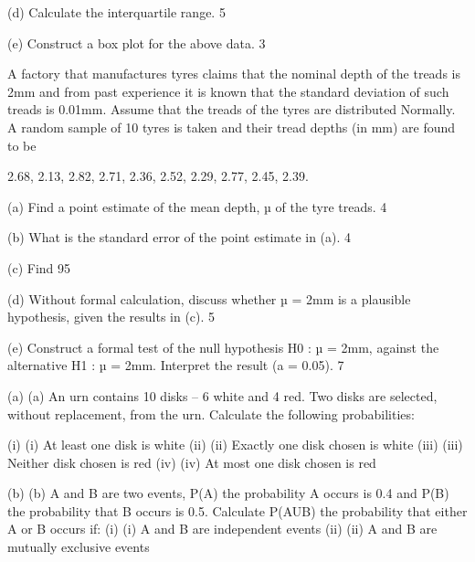 (d) Calculate the interquartile range. 						5
 
(e) Construct a box plot for the above data. 					3


A factory that manufactures tyres claims that the nominal depth of the treads is 2mm and from past experience it is known that the standard deviation of such treads is 0.01mm. Assume that the treads of the tyres are distributed Normally. A random sample of 10 tyres is taken and their tread depths (in mm) are found to be 
 
2.68, 2.13, 2.82, 2.71, 2.36, 2.52, 2.29, 2.77, 2.45, 2.39.
 
(a) Find a point estimate of the mean depth, µ of the tyre treads. 		4 
 
(b) What is the standard error of the point estimate in (a). 			4
 
(c) Find 95%
 
(d) Without formal calculation, discuss whether µ = 2mm is a plausible  hypothesis,   given the results in (c). 						5
 
(e) Construct a formal test of the null hypothesis H0 : µ = 2mm, against the alternative  H1 : µ = 2mm. Interpret the result (a = 0.05).			7 										
 
 


(a)	(a)    An urn contains 10 disks – 6 white and 4 red.  Two disks are selected, without replacement, from the urn.  Calculate the following probabilities:
 
(i)	(i)                  At least one disk is white
(ii)	(ii)                Exactly one disk chosen is white
(iii)	(iii)               Neither disk chosen is red
(iv)	(iv)              At most one disk chosen is red

 
(b)	(b)   A and B are two events, P(A)  the probability A occurs is 0.4 and P(B) the probability that B occurs is 0.5.  Calculate P(AUB) the probability that either A or B occurs if:
(i)	(i)                  A and B are independent events
(ii)	(ii)                A and B are mutually exclusive events



